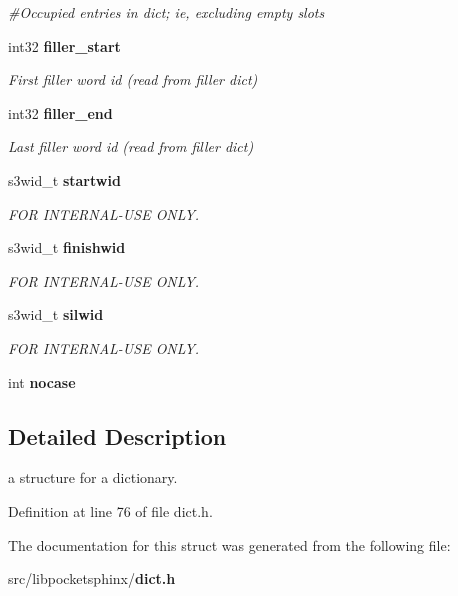 \begin{DoxyCompactItemize}
\begin{DoxyCompactList}\small\item\em \#\-Occupied entries in dict; ie, excluding empty slots \end{DoxyCompactList}\item 
int32 {\bf filler\-\_\-start}\label{structdict__t_abd48fdafaaa68a8df2fd82163c51a95c}

\begin{DoxyCompactList}\small\item\em First filler word id (read from filler dict) \end{DoxyCompactList}\item 
int32 {\bf filler\-\_\-end}\label{structdict__t_a77c6692e56308968804add1292275cb7}

\begin{DoxyCompactList}\small\item\em Last filler word id (read from filler dict) \end{DoxyCompactList}\item 
s3wid\-\_\-t {\bf startwid}\label{structdict__t_a22bc6c52ce9e04c4f3f7d0ba1972ee51}

\begin{DoxyCompactList}\small\item\em F\-O\-R I\-N\-T\-E\-R\-N\-A\-L-\/\-U\-S\-E O\-N\-L\-Y. \end{DoxyCompactList}\item 
s3wid\-\_\-t {\bf finishwid}\label{structdict__t_a3875be5336e2d9888f6d5cb83ded82c5}

\begin{DoxyCompactList}\small\item\em F\-O\-R I\-N\-T\-E\-R\-N\-A\-L-\/\-U\-S\-E O\-N\-L\-Y. \end{DoxyCompactList}\item 
s3wid\-\_\-t {\bf silwid}\label{structdict__t_aad07b22b94c360923f151c02890f6e68}

\begin{DoxyCompactList}\small\item\em F\-O\-R I\-N\-T\-E\-R\-N\-A\-L-\/\-U\-S\-E O\-N\-L\-Y. \end{DoxyCompactList}\item 
int {\bfseries nocase}\label{structdict__t_a2240400afe39fbee593ff7e33f97008c}

\end{DoxyCompactItemize}


\subsection{Detailed Description}
a structure for a dictionary. 

Definition at line 76 of file dict.\-h.



The documentation for this struct was generated from the following file\-:\begin{DoxyCompactItemize}
\item 
src/libpocketsphinx/{\bf dict.\-h}\end{DoxyCompactItemize}

